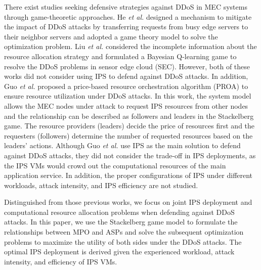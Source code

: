 \documentclass[10pt,journal, compsoc]{IEEEtran}
\begin{document}
There exist studies seeking defensive strategies against DDoS in MEC systems through game-theoretic approaches. He \emph{et al.} designed a mechanism to mitigate the impact of DDoS attacks by transferring requests from busy edge servers to their neighbor servers and adopted a game theory model to solve the optimization problem\cite{He}. Liu \emph{et al.} considered the incomplete information about the resource allocation strategy and formulated a Bayesian Q-learning game to resolve the DDoS problems in sensor edge cloud (SEC)\cite{Liu3}. However, both of these works did not consider using IPS to defend against DDoS attacks. In addition, Guo \emph{et al.} proposed a price-based resource orchestration algorithm (PROA) to ensure resource utilization under DDoS attacks\cite{Guo2}. In this work, the system model allows the MEC nodes under attack to request IPS resources from other nodes and the relationship can be described as followers and leaders in the Stackelberg game. The resource providers (leaders) decide the price of resources first and the requesters (followers) determine the number of requested resources based on the leaders' actions. Although Guo \emph{et al.} use IPS as the main solution to defend against DDoS attacks, they did not consider the trade-off in IPS deployments, as the IPS VMs would crowd out the computational resources of the main application service. In addition, the proper configurations of IPS under different workloads, attack intensity, and IPS efficiency are not studied.

Distinguished from those previous works, we focus on joint IPS deployment and computational resource allocation problems when defending against DDoS attacks. In this paper, we use the Stackelberg game model to formulate the relationships between MPO and ASPs and solve the subsequent optimization problems to maximize the utility of both sides under the DDoS attacks. The optimal IPS deployment is derived given the experienced workload, attack intensity, and efficiency of IPS VMs.
\end{document}
